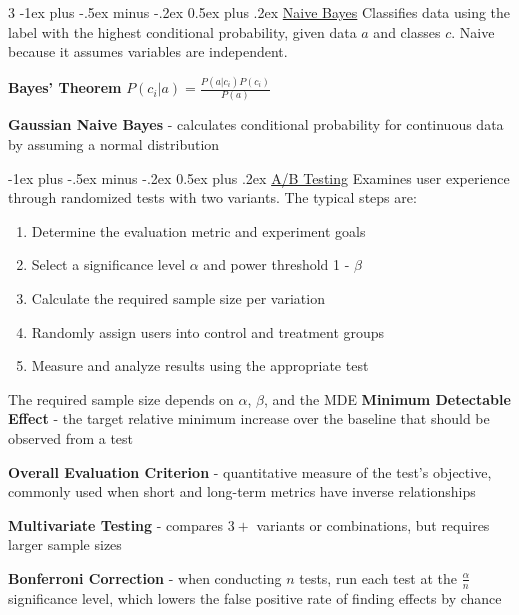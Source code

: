 \documentclass[10pt,landscape,letterpaper]{article}
\makeatletter
\renewcommand{\section}{\@startsection{section}{1}{0mm}%
                                {-1ex plus -.5ex minus -.2ex}%
                                {0.5ex plus .2ex}%
                                {\normalfont\large\bfseries}}
\makeatother
\begin{document}
\begin{multicols}{3}
\section{\href{https://migue-rc.github.io/Data-Science-Cheatsheet/\#naive-bayes}{Naive Bayes}}
Classifies data using the label with the highest conditional probability, given data $a$ and classes $c$. Naive because it assumes variables are independent.

\textbf{Bayes' Theorem} $ P({c_i}|{a})  = \frac{P({a}|{c_i})P({c_i})}{P({a})}$

\textbf{Gaussian Naive Bayes} - calculates conditional probability for continuous data by assuming a normal distribution

\columnbreak

\section{\href{https://migue-rc.github.io/Data-Science-Cheatsheet/\#ab-testing}{A/B Testing}}
Examines user experience through randomized tests with two variants.
The typical steps are:
\begin{enumerate}[leftmargin=5mm]
    \itemsep -.4mm
    \item Determine the evaluation metric and experiment goals
    \item Select a significance level $\alpha$ and power threshold 1 - $\beta$
    \item Calculate the required sample size per variation
    \item Randomly assign users into control and treatment groups
    \item Measure and analyze results using the appropriate test
\end{enumerate}

The required sample size depends on $\alpha$, $\beta$, and the MDE
\textbf{Minimum Detectable Effect} - the target relative minimum increase over the baseline that should be observed from a test
\vspace{.5mm}

\textbf{Overall Evaluation Criterion} - quantitative measure of the test's objective, commonly used when short and long-term metrics have inverse relationships
\vspace{.7mm}

\textbf{Multivariate Testing} - compares $3+$ variants or combinations, but requires larger sample sizes

\textbf{Bonferroni Correction} - when conducting $n$ tests,
run each test at the $\frac{\alpha}{n}$ significance level, which lowers the false positive rate of finding effects by chance
\vspace{.7mm}


\end{multicols}
\end{document}
